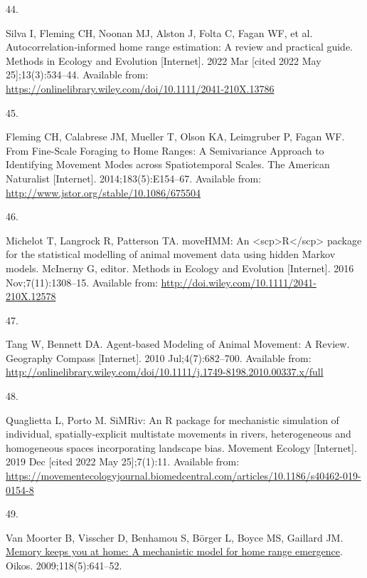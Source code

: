 \documentclass[10pt,a4paper]{article}
\newlength{\cslhangindent}
\newlength{\csllabelwidth}
\newlength{\cslentryspacingunit} %
\newenvironment{CSLReferences}[2] %
 {%
  \setlength{\parindent}{0pt}
  \ifodd #1
  \let\oldpar\par
  \def\par{\hangindent=\cslhangindent\oldpar}
  \fi
  \setlength{\parskip}{#2\cslentryspacingunit}
 }%
 {}
\newcommand{\CSLLeftMargin}[1]{\parbox[t]{\csllabelwidth}{#1}}
\newcommand{\CSLRightInline}[1]{\parbox[t]{\linewidth - \csllabelwidth}{#1}\break}
\begin{document}
\begin{CSLReferences}{0}{0}
\leavevmode{}%
\CSLLeftMargin{44. }
\CSLRightInline{Silva I, Fleming CH, Noonan MJ, Alston J, Folta C, Fagan WF, et al. Autocorrelation‐informed home range estimation: {A} review and practical guide. Methods in Ecology and Evolution {[}Internet{]}. 2022 Mar {[}cited 2022 May 25{]};13(3):534--44. Available from: \url{https://onlinelibrary.wiley.com/doi/10.1111/2041-210X.13786}}

\leavevmode{}%
\CSLLeftMargin{45. }
\CSLRightInline{Fleming CH, Calabrese JM, Mueller T, Olson KA, Leimgruber P, Fagan WF. From {Fine}-{Scale} {Foraging} to {Home} {Ranges}: {A} {Semivariance} {Approach} to {Identifying} {Movement} {Modes} across {Spatiotemporal} {Scales}. The American Naturalist {[}Internet{]}. 2014;183(5):E154--67. Available from: \url{http://www.jstor.org/stable/10.1086/675504}}

\leavevmode{}%
\CSLLeftMargin{46. }
\CSLRightInline{Michelot T, Langrock R, Patterson TA. {moveHMM}: An {\textless{}}scp{\textgreater{}}{R}{\textless{}}/scp{\textgreater{}} package for the statistical modelling of animal movement data using hidden {Markov} models. McInerny G, editor. Methods in Ecology and Evolution {[}Internet{]}. 2016 Nov;7(11):1308--15. Available from: \url{http://doi.wiley.com/10.1111/2041-210X.12578}}

\leavevmode{}%
\CSLLeftMargin{47. }
\CSLRightInline{Tang W, Bennett DA. Agent-based {Modeling} of {Animal} {Movement}: {A} {Review}. Geography Compass {[}Internet{]}. 2010 Jul;4(7):682--700. Available from: \url{http://onlinelibrary.wiley.com/doi/10.1111/j.1749-8198.2010.00337.x/full}}

\leavevmode{}%
\CSLLeftMargin{48. }
\CSLRightInline{Quaglietta L, Porto M. {SiMRiv}: An {R} package for mechanistic simulation of individual, spatially-explicit multistate movements in rivers, heterogeneous and homogeneous spaces incorporating landscape bias. Movement Ecology {[}Internet{]}. 2019 Dec {[}cited 2022 May 25{]};7(1):11. Available from: \url{https://movementecologyjournal.biomedcentral.com/articles/10.1186/s40462-019-0154-8}}

\leavevmode{}%
\CSLLeftMargin{49. }
\CSLRightInline{Van Moorter B, Visscher D, Benhamou S, Börger L, Boyce MS, Gaillard JM. \href{https://doi.org/10.1111/j.1600-0706.2008.17003.x}{Memory keeps you at home: {A} mechanistic model for home range emergence}. Oikos. 2009;118(5):641--52. }


\end{CSLReferences}
\end{document}
